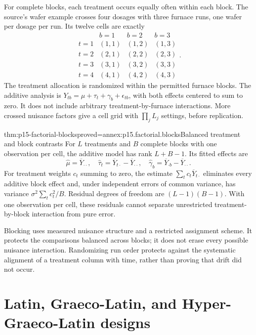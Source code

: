 For complete blocks, each treatment occurs equally often within each block.
The source's wafer example crosses four dosages with three furnace runs,
one wafer per dosage per run. Its twelve cells are exactly
\[
 \begin{array}{c|ccc}
   &b=1&b=2&b=3\\\hline
 t=1&(1,1)&(1,2)&(1,3)\\
 t=2&(2,1)&(2,2)&(2,3)\\
 t=3&(3,1)&(3,2)&(3,3)\\
 t=4&(4,1)&(4,2)&(4,3)
 \end{array}.
\]
The treatment allocation is randomized within the permitted furnace blocks.
The additive analysis is
\(Y_{tb}=\mu+\tau_t+\gamma_b+\epsilon_{tb}\), with both effects
centered to sum to zero. It does not include arbitrary treatment-by-furnace
interactions. More crossed nuisance factors give a cell grid with
\(\prod_jL_j\) settings, before replication.

\begin{hbtheorem}{thm:p15-factorial-blocks}{proved=annex:p15.factorial.blocks}{Balanced treatment and block contrasts}
For \(L\) treatments and \(B\) complete blocks with one observation per
cell, the additive model has rank \(L+B-1\). Its fitted effects are
\[
 \widehat\mu=\overline Y_{\cdot\cdot},\quad
 \widehat\tau_t=\overline Y_{t\cdot}-\overline Y_{\cdot\cdot},\quad
 \widehat\gamma_b=\overline Y_{\cdot b}-\overline Y_{\cdot\cdot}.
\]
For treatment weights \(c_t\) summing to zero, the estimate
\(\sum_tc_t\overline Y_{t\cdot}\) eliminates every additive block
effect and, under independent errors of common variance, has variance
\(\sigma^2\sum_tc_t^2/B\). Residual degrees of freedom are
\((L-1)(B-1)\). With one observation per cell, these residuals cannot
separate unrestricted treatment-by-block interaction from pure error.
\end{hbtheorem}

Blocking uses measured nuisance structure and a restricted assignment scheme.
It protects the comparisons balanced across blocks; it does not erase every
possible nuisance interaction. Randomizing run order protects against the
systematic alignment of a treatment column with time, rather than proving
that drift did not occur.

\section{Latin, Graeco-Latin, and Hyper-Graeco-Latin designs}
\label{sec:p15-factorial-squares}

